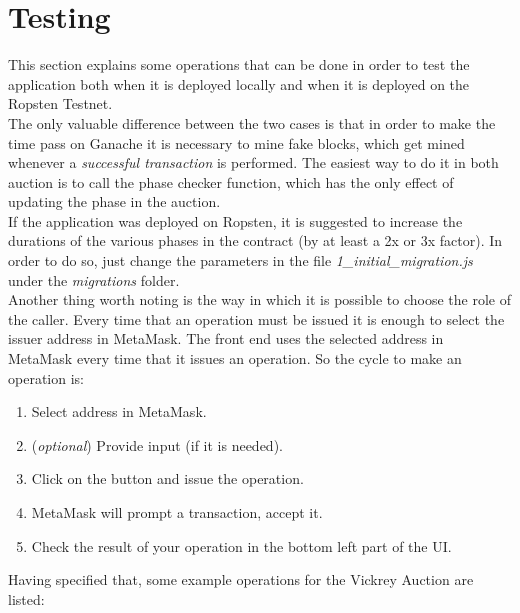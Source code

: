 \documentclass[11pt, a4paper]{report}
\begin{document}
\section*{Testing}
	This section explains some operations that can be done in order to test the application both when it is deployed locally and when it is deployed on the Ropsten Testnet. \\
	The only valuable difference between the two cases is that in order to make the time pass on Ganache it is necessary to mine fake blocks, which get mined whenever a \emph{successful transaction} is performed. The easiest way to do it in both auction is to call the phase checker function, which has the only effect of updating the phase in the auction. \\
	If the application was deployed on Ropsten, it is suggested to increase the durations of the various phases in the contract (by at least a 2x or 3x factor). In order to do so, just change the parameters in the file \emph{1\_initial\_migration.js} under the \emph{migrations} folder. \\
	Another thing worth noting is the way in which it is possible to choose the role of the caller. Every time that an operation must be issued it is enough to select the issuer address in MetaMask. The front end uses the selected address in MetaMask every time that it issues an operation. So the cycle to make an operation is:
	\begin{enumerate}
		\item Select address in MetaMask.
		\item (\emph{optional}) Provide input (if it is needed).
		\item Click on the button and issue the operation.
		\item MetaMask will prompt a transaction, accept it.
		\item Check the result of your operation in the bottom left part of the UI.
	\end{enumerate}
	Having specified that, some example operations for the Vickrey Auction are listed:
\end{document}
